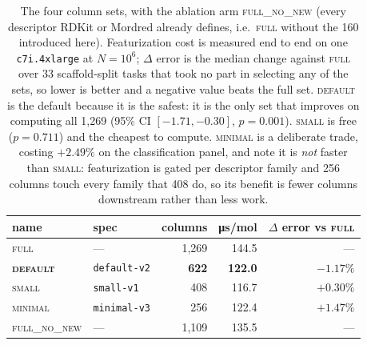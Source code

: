 \begin{table}[h]
\centering
\begin{tabular}{llrrr}
\toprule
name & spec & columns & \si{\micro\second}/mol & $\Delta$ error vs \textsc{full} \\
\midrule
\textsc{full}        & ---          & 1{,}269 & 144.5 & --- \\
\textbf{\textsc{default}} & \texttt{default-v2} & \textbf{622} & \textbf{122.0} & $\mathbf{-1.17\%}$ \\
\textsc{small}       & \texttt{small-v1}   & 408 & 116.7 & $+0.30\%$ \\
\textsc{minimal}     & \texttt{minimal-v3} & 256 & 122.4 & $+1.47\%$ \\
\textsc{full\_no\_new} & ---        & 1{,}109 & 135.5 & --- \\
\bottomrule
\end{tabular}
\caption{The four column sets, with the ablation arm \textsc{full\_no\_new} (every descriptor
RDKit or Mordred already defines, i.e.\ \textsc{full} without the 160 introduced here).
Featurization cost is measured end to end on one \texttt{c7i.4xlarge} at $N = 10^{6}$;
$\Delta$ error is the median change against \textsc{full} over 33 scaffold-split tasks that took
no part in selecting any of the sets, so lower is better and a negative value beats the full set.
\textsc{default} is the default because it is the safest: it is the only set that improves on
computing all 1{,}269 (95\% CI $[-1.71, -0.30]$, $p = 0.001$). \textsc{small} is free
($p = 0.711$) and the cheapest to compute. \textsc{minimal} is a deliberate trade, costing
$+2.49\%$ on the classification panel, and note it is \emph{not} faster than \textsc{small}:
featurization is gated per descriptor family and 256 columns touch every family that 408 do, so
its benefit is fewer columns downstream rather than less work.}
\label{tab:column-sets}
\end{table}
